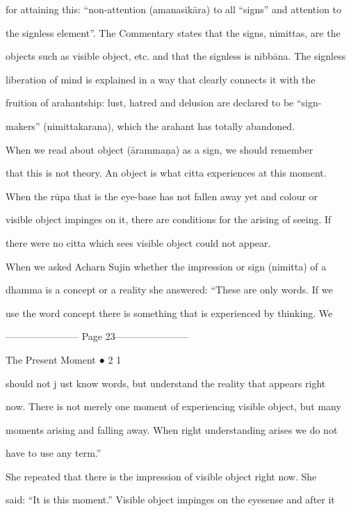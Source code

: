 for attaining this: “non-attention  (amanasikāra) to all “signs” and attention to  

the signless element”. The Commentary states that the signs, nimittas, are the  

objects such as visible object, etc. and that the signless is nibbāna. The signless  

liberation   of  mind   is  explained  in   a  way   that   clearly  connects  it  with   the  

fruition  of  arahantship:  lust,  hatred  and  delusion  are  declared  to  be  “sign- 

makers” (nimittakarana), which the arahant has totally abandoned. 

     When we  read  about  object  (ārammaṇa)  as  a  sign, we  should  remember  

that  this  is  not  theory. An   object  is  what  citta  experiences  at  this  moment.  

When  the  rūpa  that  is  the  eye-base  has  not  fallen  away  yet   and  colour  or  

visible object impinges on it, there  are conditions for the arising of  seeing. If  

there were no citta which sees visible object could not appear. 

   When we asked Acharn Sujin whether the impression or sign  (nimitta) of a  

dhamma is a concept or a reality she answered: “These are only words. If we  

use the word concept there is  something that is experienced by thinking. We  


----------------------- Page 23-----------------------

                                                                   The Present Moment ● 2 1 



should  not j ust  know  words,   but   understand  the  reality  that  appears  right  

now. There is not merely one moment of experiencing visible object, but many  

moments arising and falling away. When right understanding arises we do not  

have to use any term.” 

   She  repeated  that  there  is  the  impression  of visible  object  right  now.  She  

said: “It is this moment.” Visible object impinges on the eyesense and after it  

